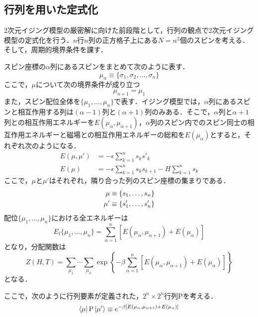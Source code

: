 \documentclass[a4paper,11pt]{jsreport}
\begin{document}
\subsection{行列を用いた定式化}
2次元イジング模型の厳密解に向けた前段階として，行列の観点で2次元イジング模型の定式化を行う．$n$行$n$列の正方格子上にある$N=n^2$個のスピンを考える．そして，周期的境界条件を課す．\par
スピン座標の$\alpha$列にあるスピンをまとめて次のように表す．
\begin{equation}
  \mu_{\alpha}
  \equiv \{\sigma_1, \sigma_2, \dots, \sigma_n\}
\end{equation}
ここで，$\mu$について次の境界条件が成り立つ
\begin{equation}
  \mu_{n+1} = \mu_1 
\end{equation}
また，スピン配位全体を$\{\mu_1, \dots, \mu_n\}$で表す．イジング模型では，$\alpha$列にあるスピンと相互作用する列は$(\alpha-1)$列と$(\alpha+1)$列のみある．そこで，$\alpha$列と$\alpha+1$列との相互作用エネルギーを$E(\mu_{\alpha}, \mu_{\alpha+1})$，$\alpha$列のスピン内でのスピン同士の相互作用エネルギーと磁場との相互作用エネルギーの総和を$E(\mu_{\alpha})$とすると，それぞれ次のようになる．
\begin{align}
  E(\mu, \mu')
   & = -\epsilon \sum_{k=1}^n s_k s'_k                         \\
  E(\mu)
   & = -\epsilon \sum_{k=1}^n s_k s_{k+1} - H \sum_{k=1}^n s_k
\end{align}
ここで，$\mu$と$\mu'$はそれぞれ，隣り合った列のスピン座標の集まりである．
\begin{align}
  \mu  & \equiv \{s_1, \dots, s_n \} \notag \\
  \mu' & \equiv \{s'_1, \dots, s'_n \}
  \label{イジングエネルギー２}
\end{align}
配位$\{\mu_1, \dots, \mu_n\}$における全エネルギーは
\begin{equation}
  E_t\{\mu_1, \dots, \mu_n \}
  = \sum_{\alpha=1}^n [E(\mu_{\alpha}, \mu_{\alpha+1}) + E(\mu_{\alpha})]
\end{equation}
となり，分配関数は
\begin{equation}
  Z(H,T)
  = \sum_{\mu_1} \cdots \sum_{\mu_n} \exp{\left\{ -\beta \sum_{\alpha=1}^n [E(\mu_{\alpha}, \mu_{\alpha+1}) + E(\mu_{\alpha})] \right\}}
\end{equation}
となる．\par
ここで，次のように行列要素が定義された，$2^n \times 2^n$行列$\mathrm{P}$を考える．
\begin{equation}
  \bra{\mu} \mathrm{P} \ket{\mu'} \equiv e^{-\beta [E(\mu_{\alpha}, \mu_{\alpha+1}) + E(\mu_{\alpha})]}
  \label{行列要素}
\end{equation}
\end{document}
